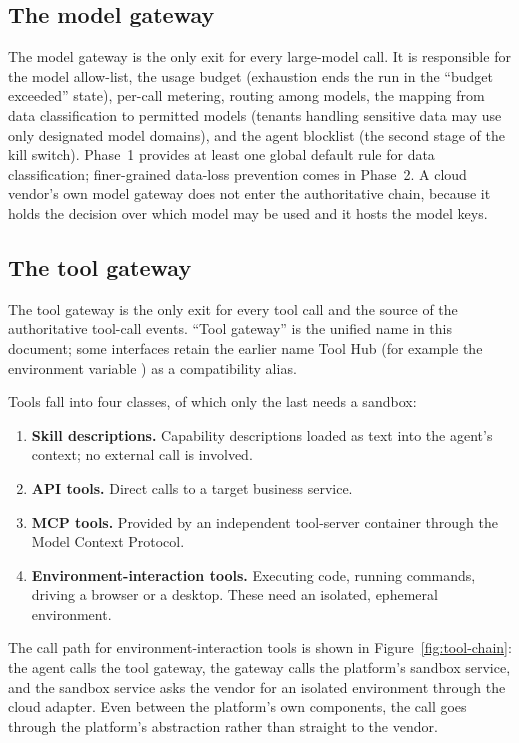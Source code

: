 \subsection{The model gateway}

The model gateway is the only exit for every large-model call. It is responsible for the model allow-list, the usage budget (exhaustion ends the run in the ``budget exceeded'' state), per-call metering, routing among models, the mapping from data classification to permitted models (tenants handling sensitive data may use only designated model domains), and the agent blocklist (the second stage of the kill switch). Phase~1 provides at least one global default rule for data classification; finer-grained data-loss prevention comes in Phase~2. A cloud vendor's own model gateway does not enter the authoritative chain, because it holds the decision over which model may be used and it hosts the model keys.

\subsection{The tool gateway}

The tool gateway is the only exit for every tool call and the source of the authoritative tool-call events. ``Tool gateway'' is the unified name in this document; some interfaces retain the earlier name Tool Hub (for example the environment variable ) as a compatibility alias.

Tools fall into four classes, of which only the last needs a sandbox:

\begin{enumerate}
  \item \textbf{Skill descriptions.} Capability descriptions loaded as text into the agent's context; no external call is involved.
  \item \textbf{API tools.} Direct calls to a target business service.
  \item \textbf{MCP tools.} Provided by an independent tool-server container through the Model Context Protocol.
  \item \textbf{Environment-interaction tools.} Executing code, running commands, driving a browser or a desktop. These need an isolated, ephemeral environment.
\end{enumerate}

The call path for environment-interaction tools is shown in Figure~\ref{fig:tool-chain}: the agent calls the tool gateway, the gateway calls the platform's sandbox service, and the sandbox service asks the vendor for an isolated environment through the cloud adapter. Even between the platform's own components, the call goes through the platform's abstraction rather than straight to the vendor.


